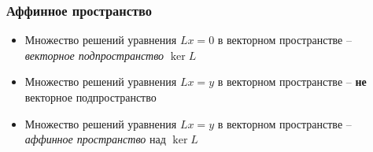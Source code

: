 \documentclass[10pt]{beamer}
\begin{document}
\begin{frame}[fragile]
\frametitle{Аффинное пространство}
\begin{itemize}
\item Множество решений уравнения \begin{math}Lx=0\end{math} в векторном пространстве -- \textit{векторное подпространство} \begin{math}\ker L\end{math}
\pause
\item Множество решений уравнения \begin{math}Lx=y\end{math} в векторном пространстве -- \alert{\textbf{не}} векторное подпространство
\pause
\item Множество решений уравнения \begin{math}Lx=y\end{math} в векторном пространстве -- \textit{аффинное пространство} над \begin{math}\ker L\end{math}
\end{itemize}
\end{frame}
\end{document}
